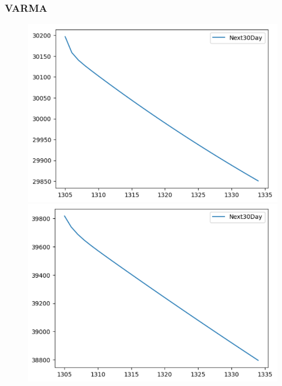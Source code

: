 \subsubsection{VARMA}
\begin{figure}[H]
    \centering
    \begin{minipage}{0.15\textwidth}
    \centering
    \includegraphics[width=1\textwidth]{resources/chapter-5/newdata/predicted/BIDV_VARMA_7-3_30days.png}
    \end{minipage}
    \hfill
    \begin{minipage}{0.15\textwidth}
    \centering
    \includegraphics[width=1\textwidth]{resources/chapter-5/newdata/predicted/BIDV_VARMA_8-2_30days.png}
    \end{minipage}
    \hfill
        \begin{minipage}{0.15\textwidth}

\end{minipage}
\end{figure}
